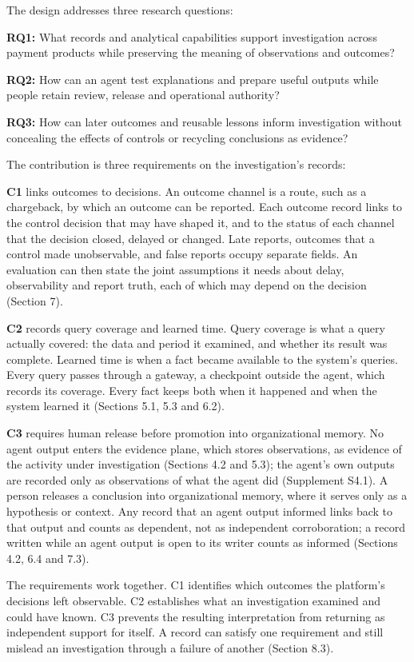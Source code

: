 \documentclass[acmlarge,review,anonymous,nonacm]{acmart}
\begin{document}
The design addresses three research questions:

\textbf{RQ1:} What records and analytical capabilities support
investigation across payment products while preserving the meaning of
observations and outcomes?

\textbf{RQ2:} How can an agent test explanations and prepare useful
outputs while people retain review, release and operational authority?

\textbf{RQ3:} How can later outcomes and reusable lessons inform
investigation without concealing the effects of controls or recycling
conclusions as evidence?

The contribution is three requirements on the investigation's records:

\textbf{C1} links outcomes to decisions. An outcome channel is a route,
such as a chargeback, by which an outcome can be reported. Each outcome
record links to the control decision that may have shaped it, and to the
status of each channel that the decision closed, delayed or changed.
Late reports, outcomes that a control made unobservable, and false
reports occupy separate fields. An evaluation can then state the joint
assumptions it needs about delay, observability and report truth, each
of which may depend on the decision (Section 7).

\textbf{C2} records query coverage and learned time. Query coverage is
what a query actually covered: the data and period it examined, and
whether its result was complete. Learned time is when a fact became
available to the system's queries. Every query passes through a gateway,
a checkpoint outside the agent, which records its coverage. Every fact
keeps both when it happened and when the system learned it (Sections
5.1, 5.3 and 6.2).

\textbf{C3} requires human release before promotion into organizational
memory. No agent output enters the evidence plane, which stores
observations, as evidence of the activity under investigation (Sections
4.2 and 5.3); the agent's own outputs are recorded only as observations
of what the agent did (Supplement S4.1). A person releases a conclusion
into organizational memory, where it serves only as a hypothesis or
context. Any record that an agent output informed links back to that
output and counts as dependent, not as independent corroboration; a
record written while an agent output is open to its writer counts as
informed (Sections 4.2, 6.4 and 7.3).

The requirements work together. C1 identifies which outcomes the
platform's decisions left observable. C2 establishes what an
investigation examined and could have known. C3 prevents the resulting
interpretation from returning as independent support for itself. A
record can satisfy one requirement and still mislead an investigation
through a failure of another (Section 8.3).
\end{document}
